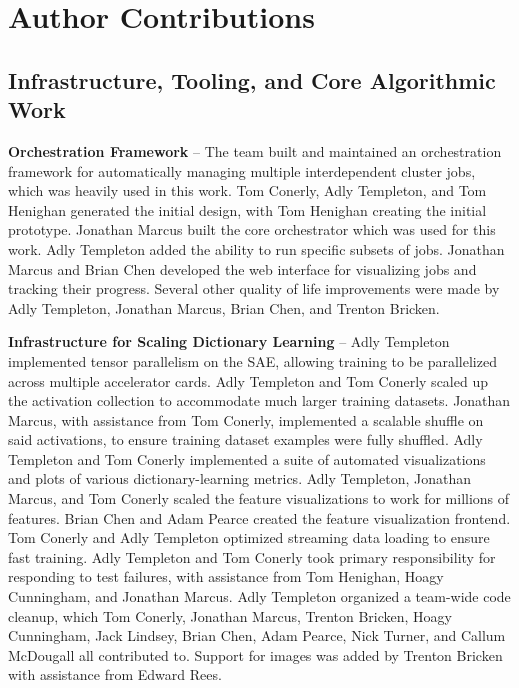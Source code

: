 \documentclass{article}
\let\oldsection\section
\renewcommand{\section}{\FloatBarrier\oldsection}
\let\oldsubsection\subsection
\renewcommand{\subsection}{\FloatBarrier\oldsubsection}
\begin{document}
\section{Author Contributions}\label{sec:appendix-author-contributions}

\subsection{Infrastructure, Tooling, and Core Algorithmic Work}

\textbf{Orchestration Framework }-- The team built and maintained an orchestration framework for automatically managing multiple interdependent cluster jobs, which was heavily used in this work. Tom Conerly, Adly Templeton, and Tom Henighan generated the initial design, with Tom Henighan creating the initial prototype. Jonathan Marcus built the core orchestrator which was used for this work. Adly Templeton added the ability to run specific subsets of jobs. Jonathan Marcus and Brian Chen developed the web interface for visualizing jobs and tracking their progress. Several other quality of life improvements were made by Adly Templeton, Jonathan Marcus, Brian Chen, and Trenton Bricken.

\textbf{Infrastructure for Scaling Dictionary Learning }-- Adly Templeton implemented tensor parallelism on the SAE, allowing training to be parallelized across multiple accelerator cards. Adly Templeton and Tom Conerly scaled up the activation collection to accommodate much larger training datasets. Jonathan Marcus, with assistance from Tom Conerly, implemented a scalable shuffle on said activations, to ensure training dataset examples were fully shuffled. Adly Templeton and Tom Conerly implemented a suite of automated visualizations and plots of various dictionary-learning metrics. Adly Templeton, Jonathan Marcus, and Tom Conerly scaled the feature visualizations to work for millions of features. Brian Chen and Adam Pearce created the feature visualization frontend. Tom Conerly and Adly Templeton optimized streaming data loading to ensure fast training. Adly Templeton and Tom Conerly took primary responsibility for responding to test failures, with assistance from Tom Henighan, Hoagy Cunningham, and Jonathan Marcus. Adly Templeton organized a team-wide code cleanup, which Tom Conerly, Jonathan Marcus, Trenton Bricken, Hoagy Cunningham, Jack Lindsey, Brian Chen, Adam Pearce, Nick Turner, and Callum McDougall all contributed to. Support for images was added by Trenton Bricken with assistance from Edward Rees.
\end{document}
